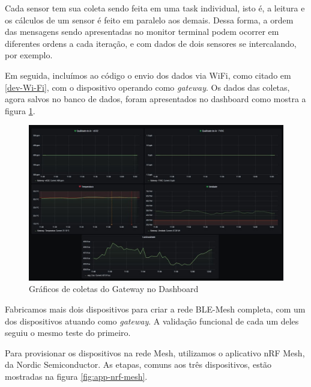 \documentclass[../monografia.tex]{subfiles}
\begin{document}
Cada sensor tem sua coleta sendo feita em uma task individual, isto é, a leitura e os cálculos de um sensor é feito em paralelo aos demais. Dessa forma, a ordem das mensagens sendo apresentadas no monitor terminal podem ocorrer em diferentes ordens a cada iteração, e com dados de dois sensores se intercalando, por exemplo. \newpage

Em seguida, incluímos ao código o envio dos dados via WiFi, como citado em \ref{dev-Wi-Fi}, com o dispositivo operando como \textit{gateway}. Os dados das coletas, agora salvos no banco de dados, foram apresentados no dashboard como mostra a figura \ref{fig:dashboard-graphs}.

\begin{figure}[h]
	\centering
	\includegraphics[width=\textwidth]{dashboard-graphs}
	\caption{Gráficos de coletas do Gateway no Dashboard}
	\label{fig:dashboard-graphs}
\end{figure}

Fabricamos mais dois dispositivos para criar a rede BLE-Mesh completa, com um dos dispositivos atuando como \textit{gateway}. A validação funcional de cada um deles seguiu o mesmo teste do primeiro.  

Para provisionar os dispositivos na rede Mesh, utilizamos o aplicativo nRF Mesh\cite{nrf-app}, da Nordic Semiconductor. As etapas, comuns aos três dispositivos, estão mostradas na figura \ref{fig:app-nrf-mesh}.
\end{document}
